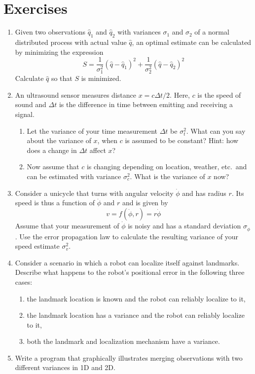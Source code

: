 \section*{Exercises}\small
\begin{enumerate}
\item Given two observations $\hat{q}_1$ and $\hat{q}_2$ with variances $\sigma_1$ and $\sigma_2$ of a normal distributed process with actual value $\hat{q}$, an optimal estimate can be calculated by minimizing the expression
\begin{equation}
\nonumber
S=\frac{1}{\sigma_1^2}(\hat{q}-\hat{q}_1)^2+\frac{1}{\sigma_2^2}(\hat{q}-\hat{q}_2)^2
\end{equation}
Calculate $\hat{q}$ so that $S$ is minimized.
\item An ultrasound sensor measures distance $x=c\Delta t/2$. Here, $c$ is the speed of sound and $\Delta t$ is the difference in time between emitting and receiving a signal.
\begin{enumerate}
\item Let the variance of your time measurement $\Delta t$ be $\sigma_t^2$. What can you say about the variance of $x$, when $c$ is assumed to be constant? Hint: how does a change in $\Delta t$ affect $x$?
\item Now assume that $c$ is changing depending on location, weather, etc.\ and can be estimated with variance $\sigma_c^2$. What is the variance of $x$ now?
\end{enumerate}
\item Consider a unicycle that turns with angular velocity $\dot{\phi}$ and has radius $r$. Its speed is thus a function of $\dot{\phi}$ and $r$ and is given by
\begin{equation}
\nonumber
v=f(\dot{\phi},r)=r\dot{\phi}
\end{equation}
Assume that your measurement of $\dot{\phi}$ is noisy and has a standard deviation $\sigma_{\dot{\phi}}$.  Use the error propagation law to calculate the resulting variance of your speed estimate $\sigma_v^2$.
\item Consider a scenario in which a robot can localize itself against landmarks. Describe what happens to the robot's positional error in the following three cases:
\begin{enumerate}
\item the landmark location is known and the robot can reliably localize to it,
\item the landmark location has a variance and the robot can reliably localize to it,
\item both the landmark and localization mechanism have a variance.
\end{enumerate}
\item Write a program that graphically illustrates merging observations with two different variances in 1D and 2D.
\end{enumerate}
\normalsize
